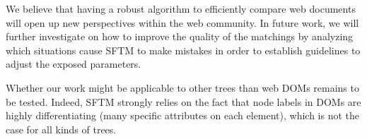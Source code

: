 \documentclass{vldb}
\begin{document}
We believe that having a robust algorithm to efficiently compare web documents will open up new perspectives within the web community.
In future work, we will further investigate on how to improve the quality of the matchings by analyzing which situations cause SFTM to make mistakes in order to establish guidelines to adjust the exposed parameters.

Whether our work might be applicable to other trees than web DOMs remains to be tested.
Indeed, SFTM strongly relies on the fact that node labels in DOMs are highly differentiating (many specific attributes on each element), which is not the case for all kinds of trees.



\end{document}
